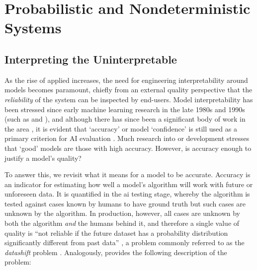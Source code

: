 \section{Probabilistic and Nondeterministic Systems}
\label{sec:background:probabilistic-stochastic}

\noindent
{}

\noindent
{}

\subsection{Interpreting the Uninterpretable}
\label{ssec:background:probabilistic-stochastic:model-interpretability}

As the rise of applied  increases, the need for engineering interpretability around models becomes paramount, chiefly from an external quality perspective that the \textit{reliability} of the system can be inspected by end-users. Model interpretability has been stressed since early machine learning research in the late 1980s and 1990s (such as \citet{Quinlan:1999ue} and \citet{Michie:1988te}), and although there has since been a significant body of work in the area \citep{Singh:2016wu,Baehrens:2010tj,Ribeiro:2016gg,Bussone:2015wm,Ross:2017vn,Lipton:2016if,Boz:2002uv,Johansson:2009uo,Augasta:2012wx,Fung:2005we,Dejaeger:2012up,VanAssche:2007wc,BenDavid:1995up,Feelders:2000ve,Lima:2009tm,Martens:2011uh,Pazzani:1997vp,Verbeke:2011vo}, it is evident that `accuracy' or model `confidence' is still used as a primary criterion for AI evaluation \citep{Huang:2005tc,Japkowicz:2011vy,Sokolova:2009vu}. Much research into  or  development stresses that `good' models are those with high accuracy. However, is accuracy enough to justify a model's quality?

To answer this, we revisit what it means for a model to be accurate. Accuracy is an indicator for estimating how well a model's algorithm will work with future or unforeseen data. It is quantified in the \gls{ai} testing stage, whereby the algorithm is tested against cases known by humans to have ground truth but such cases are unknown by the algorithm. In production, however, all cases are unknown by both the algorithm \textit{and} the humans behind it, and therefore a single value of quality is ``not reliable if the future dataset has a probability distribution significantly different from past data'' \citep{Freitas:2014ic}, a problem commonly referred to as the \textit{datashift} problem \citep{Sugiyama:2017ud}. Analogously, \citet{Freitas:2014ic} provides the following description of the problem:

